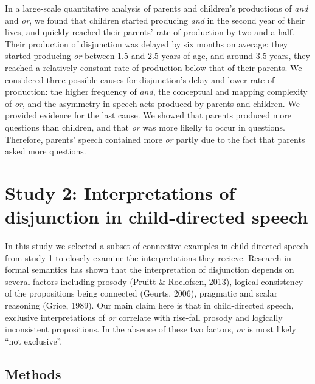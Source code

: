 \documentclass[,man,floatsintext]{apa6}
\begin{document}
In a large-scale quantitative analysis of parents and children's productions of \emph{and} and \emph{or}, we found that children started producing \emph{and} in the second year of their lives, and quickly reached their parents' rate of production by two and a half. Their production of disjunction was delayed by six months on average: they started producing \emph{or} between 1.5 and 2.5 years of age, and around 3.5 years, they reached a relatively constant rate of production below that of their parents. We considered three possible causes for disjunction's delay and lower rate of production: the higher frequency of \emph{and}, the conceptual and mapping complexity of \emph{or}, and the asymmetry in speech acts produced by parents and children. We provided evidence for the last cause. We showed that parents produced more questions than children, and that \emph{or} was more likelly to occur in questions. Therefore, parents' speech contained more \emph{or} partly due to the fact that parents asked more questions.

\hypertarget{study-2-interpretations-of-disjunction-in-child-directed-speech}{%
\section{Study 2: Interpretations of disjunction in child-directed speech}\label{study-2-interpretations-of-disjunction-in-child-directed-speech}}

In this study we selected a subset of connective examples in child-directed speech from study 1 to closely examine the interpretations they recieve. Research in formal semantics has shown that the interpretation of disjunction depends on several factors including prosody (Pruitt \& Roelofsen, 2013), logical consistency of the propositions being connected (Geurts, 2006), pragmatic and scalar reasoning (Grice, 1989). Our main claim here is that in child-directed speech, exclusive interpretations of \emph{or} correlate with rise-fall prosody and logically inconsistent propositions. In the absence of these two factors, \emph{or} is most likely \enquote{not exclusive}.

\hypertarget{methods-1}{%
\subsection{Methods}\label{methods-1}}
\end{document}
